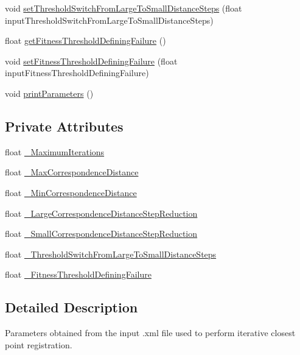 \begin{DoxyCompactItemize}
\item 
void \hyperlink{classIterativeClosestPointParameters_a05a1d4739cdf40be86004f92dbc16f32}{set\-Threshold\-Switch\-From\-Large\-To\-Small\-Distance\-Steps} (float input\-Threshold\-Switch\-From\-Large\-To\-Small\-Distance\-Steps)
\item 
float \hyperlink{classIterativeClosestPointParameters_a0e8f1f89a2612eea2617c3d60d7a7965}{get\-Fitness\-Threshold\-Defining\-Failure} ()
\item 
void \hyperlink{classIterativeClosestPointParameters_ab25b2e63147776c5d45a10f8505a22b4}{set\-Fitness\-Threshold\-Defining\-Failure} (float input\-Fitness\-Threshold\-Defining\-Failure)
\item 
void \hyperlink{classIterativeClosestPointParameters_a6e5267a21bd5949c6be2d522f92b3a98}{print\-Parameters} ()
\end{DoxyCompactItemize}
\subsection*{Private Attributes}
\begin{DoxyCompactItemize}
\item 
float \hyperlink{classIterativeClosestPointParameters_a8b9b3a2560aad7053b51838178a77448}{\-\_\-\-Maximum\-Iterations}
\item 
float \hyperlink{classIterativeClosestPointParameters_ad8339424eb93a8c4b21ded0bfc7e31db}{\-\_\-\-Max\-Correspondence\-Distance}
\item 
float \hyperlink{classIterativeClosestPointParameters_a0ac4b3b1537c98e6e4a0455db1965d5f}{\-\_\-\-Min\-Correspondence\-Distance}
\item 
float \hyperlink{classIterativeClosestPointParameters_a7e4ba577ce0925364c436defb7848f3e}{\-\_\-\-Large\-Correspondence\-Distance\-Step\-Reduction}
\item 
float \hyperlink{classIterativeClosestPointParameters_af7464d662390ed1a01d2208f6b615dc4}{\-\_\-\-Small\-Correspondence\-Distance\-Step\-Reduction}
\item 
float \hyperlink{classIterativeClosestPointParameters_a65c322e9bacd48481fb2bb9b49501893}{\-\_\-\-Threshold\-Switch\-From\-Large\-To\-Small\-Distance\-Steps}
\item 
float \hyperlink{classIterativeClosestPointParameters_abd7ebdbc7022d2fc7f321103139bb0d9}{\-\_\-\-Fitness\-Threshold\-Defining\-Failure}
\end{DoxyCompactItemize}


\subsection{Detailed Description}
Parameters obtained from the input .xml file used to perform iterative closest point registration. 

